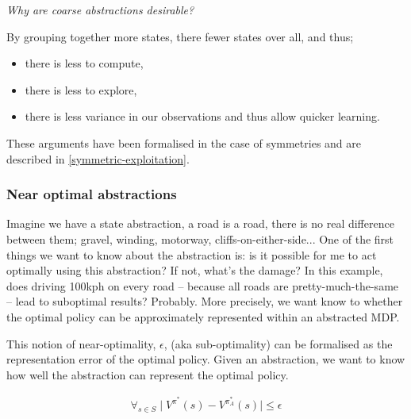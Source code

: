 
\begin{displayquote}
\textsl{Why are coarse abstractions desirable?}
\end{displayquote}

By grouping together more states, there fewer states over all, and thus;
\begin{itemize}
  \tightlist
  \item there is less to compute,
  \item there is less to explore,
  \item there is less variance in our observations and thus allow quicker learning.
\end{itemize}

These arguments have been formalised in the case of symmetries and are described in \ref{symmetric-exploitation}.


\subsubsection{Near optimal abstractions}\label{near-optimal-abstraction}

Imagine we have a state abstraction, a road is a road, there is no real difference
between them; gravel, winding, motorway, cliffs-on-either-side...
One of the first things we want to know about the abstraction is:
is it possible for me to act optimally
using this abstraction? If not, what's the damage? In this example, does driving 100kph on every road --
because all roads are pretty-much-the-same -- lead to suboptimal results? Probably.
More precisely, we want know to whether the optimal policy can be approximately represented within an abstracted MDP.

This notion of near-optimality, $\epsilon$, (aka sub-optimality) can be formalised as the representation error of the optimal
policy. \cite{Abel2017} Given an abstraction, we want to know how well the abstraction can represent the optimal policy.

\begin{align}
\forall_{s\in S} \mid V^{\pi^* }(s) - V^{\pi_{A}^* }(s) \mid \le \epsilon
\end{align}

